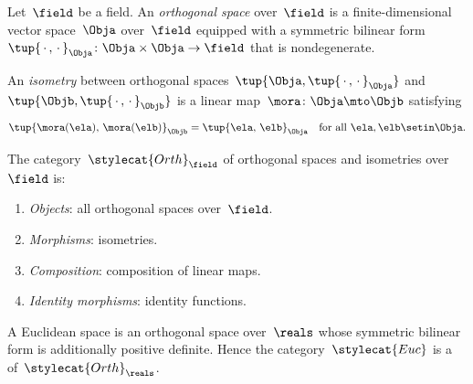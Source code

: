\begin{ctdefinition}
    \label{def:cat-of-orthogonal-isometries}
    Let~$\field$ be a field.
    An \emph{orthogonal space} over~$\field$ is a finite-dimensional vector space~$\Obja$ over~$\field$ equipped with a symmetric bilinear form~$\tup{\,\cdot\,,\,\cdot\,}_\Obja \colon \Obja \times \Obja \to \field$ that is nondegenerate.

    An \emph{isometry} between orthogonal spaces~$\tup{\Obja, \tup{\,\cdot\,,\,\cdot\,}_\Obja}$ and~$\tup{\Objb, \tup{\,\cdot\,,\,\cdot\,}_\Objb}$ is a linear map~$\mora \colon \Obja \mto \Objb$ satisfying
    \begin{equation}
        \tup{\mora(\ela),\, \mora(\elb)}_\Objb = \tup{\ela,\, \elb}_\Obja \quad \text{for all } \ela, \elb \setin \Obja.
    \end{equation}

    The category~$\stylecat{Orth}_\field$ of orthogonal spaces and isometries over~$\field$ is:
    \begin{enumerate}
        \item \emph{Objects}: all orthogonal spaces over~$\field$.
        \item \emph{Morphisms}: isometries.
        \item \emph{Composition}: composition of linear maps.
        \item \emph{Identity morphisms}: identity functions.
    \end{enumerate}
\end{ctdefinition}

\begin{remark}
    A Euclidean space is an orthogonal space over~$\reals$ whose symmetric bilinear form is additionally positive definite.
    Hence the category~$\stylecat{Euc}$ is a  of~$\stylecat{Orth}_\reals$.
\end{remark}

